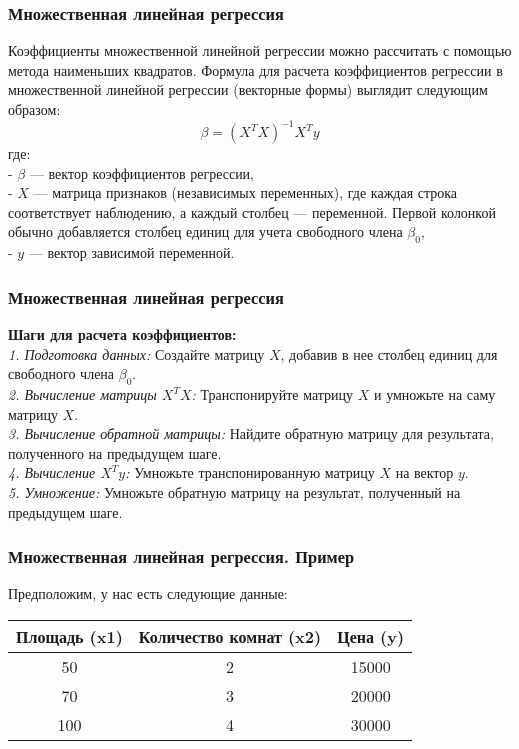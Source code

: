 \documentclass[aspectratio=169]{beamer}
\begin{document}
\begin{frame}
\frametitle{Множественная линейная регрессия}
Коэффициенты множественной линейной регрессии можно рассчитать с помощью метода наименьших квадратов. Формула для расчета коэффициентов регрессии в множественной линейной регрессии (векторные формы) выглядит следующим образом:
\[
\beta = (X^T X)^{-1} X^T y
\]
где:\\
- \(\beta\) — вектор коэффициентов регрессии,\\
- \(X\) — матрица признаков (независимых переменных), где каждая строка соответствует наблюдению, а каждый столбец — переменной. Первой колонкой обычно добавляется столбец единиц для учета свободного члена \(\beta_0\),\\
- \(y\) — вектор зависимой переменной.
\end{frame}

\begin{frame}
\frametitle{Множественная линейная регрессия}
{\bf Шаги для расчета коэффициентов:}\\
{\it 1. Подготовка данных:} Создайте матрицу \(X\), добавив в нее столбец единиц для свободного члена \(\beta_0\).\\
{\it 2. Вычисление матрицы \(X^T X\):} Транспонируйте матрицу \(X\) и умножьте на саму матрицу \(X\).\\
{\it 3. Вычисление обратной матрицы:} Найдите обратную матрицу для результата, полученного на предыдущем шаге.\\
{\it 4. Вычисление \(X^T y\):} Умножьте транспонированную матрицу \(X\) на вектор \(y\).\\
{\it 5. Умножение:} Умножьте обратную матрицу на результат, полученный на предыдущем шаге.
\end{frame}

\begin{frame}
\frametitle{Множественная линейная регрессия. Пример}
Предположим, у нас есть следующие данные:
\begin{center}
\begin{tabular}{ |c|c|c| } 
 \hline
 Площадь (x1) & Количество комнат (x2) & Цена (y) \\ 
 \hline
 50 & 2 & 15000\\
 \hline
 70 & 3 & 20000\\
 \hline
 100 & 4 & 30000\\
 \hline
\end{tabular}
\end{center}
\end{frame}
\end{document}
